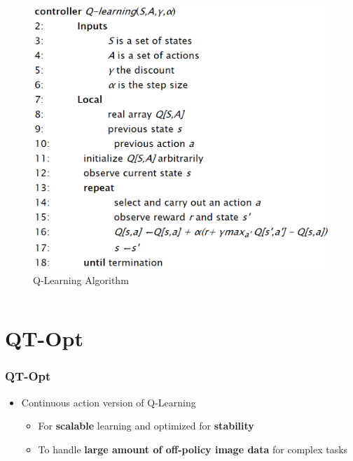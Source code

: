 \documentclass{beamer}
\newcommand{\forthSec}{QT-Opt}
\begin{document}
\begin{frame}
\begin{columns}[b]
           \centering
           \begin{figure}
             \includegraphics[width=.9\linewidth]{Images/Q-Learning.png}
             \caption{Q-Learning Algorithm}
             \label{fig:QLearningAlgorithm}
           \end{figure}
      \end{columns}
    \end{frame}


  \section{\forthSec}
    \begin{frame}
      \frametitle{\forthSec}
      \begin{itemize}
        \item \Large{Continuous action version of Q-Learning}
        \begin{itemize}
          \item For \textbf{scalable} learning and optimized for \textbf{stability}
          \item To handle \textbf{large amount of off-policy image data} for complex tasks
        \end{itemize}
      \end{itemize}
    \end{frame}
\end{document}
